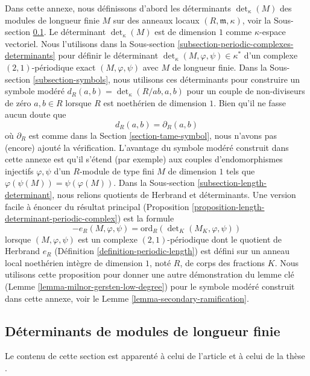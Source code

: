 \noindent
Dans cette annexe, nous définissons d'abord les déterminants $\det_\kappa(M)$
des modules de longueur finie $M$ sur des anneaux locaux $(R, \mathfrak m, \kappa)$,
voir la Sous-section \ref{subsection-determinants-finite-length}.
Le déterminant $\det_\kappa(M)$ est de dimension $1$ comme $\kappa$-espace vectoriel.
Nous l'utilisons dans la Sous-section \ref{subsection-periodic-complexes-determinants}
pour définir le déterminant $\det_\kappa(M, \varphi, \psi) \in \kappa^*$
d'un complexe $(2, 1)$-périodique exact $(M, \varphi, \psi)$
avec $M$ de longueur finie. Dans la Sous-section \ref{subsection-symbols},
nous utilisons ces déterminants pour construire un symbole modéré
$d_R(a, b) = \det_\kappa(R/ab, a, b)$ pour un couple de non-diviseurs de zéro
$a, b \in R$ lorsque $R$ est noethérien de dimension $1$.
Bien qu'il ne fasse aucun doute que
$$
d_R(a, b) = \partial_R(a, b)
$$
où $\partial_R$ est comme dans la Section \ref{section-tame-symbol},
nous n'avons pas (encore) ajouté la vérification. L'avantage du
symbole modéré construit dans cette annexe est qu'il s'étend
(par exemple) aux couples d'endomorphismes injectifs $\varphi, \psi$
d'un $R$-module de type fini $M$ de dimension $1$ tels que
$\varphi(\psi(M)) = \psi(\varphi(M))$. Dans la
Sous-section \ref{subsection-length-determinant},
nous relions quotients de Herbrand et déterminants.
Une version facile à énoncer du résultat principal
(Proposition \ref{proposition-length-determinant-periodic-complex})
est la formule
$$
-e_R(M, \varphi, \psi) =
\text{ord}_R(\det\nolimits_K(M_K, \varphi, \psi))
$$
lorsque $(M, \varphi, \psi)$ est un complexe $(2, 1)$-périodique
dont le quotient de Herbrand $e_R$ (Définition \ref{definition-periodic-length})
est défini
sur un anneau local noethérien intègre de dimension $1$, noté $R$, de corps des fractions $K$.
Nous utilisons cette proposition pour donner une autre démonstration du lemme clé
(Lemme \ref{lemma-milnor-gersten-low-degree})
pour le symbole modéré construit dans cette annexe, voir le
Lemme \ref{lemma-secondary-ramification}.


\subsection{Déterminants de modules de longueur finie}
\label{subsection-determinants-finite-length}

\noindent
Le contenu de cette section est apparenté à celui de
l'article \cite{determinant} et à celui de la
thèse \cite{Joe}.


